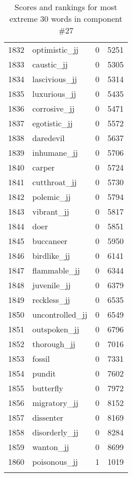 \begin{longtable}[!htbp]{| rlr@{.}l |}
    1832 & optimistic\_jj & 0 & 5251 \\
    1833 & caustic\_jj & 0 & 5305 \\
    1834 & lascivious\_jj & 0 & 5314 \\
    1835 & luxurious\_jj & 0 & 5435 \\
    1836 & corrosive\_jj & 0 & 5471 \\
    1837 & egotistic\_jj & 0 & 5572 \\
    1838 & daredevil & 0 & 5637 \\
    1839 & inhumane\_jj & 0 & 5706 \\
    1840 & carper & 0 & 5724 \\
    1841 & cutthroat\_jj & 0 & 5730 \\
    1842 & polemic\_jj & 0 & 5794 \\
    1843 & vibrant\_jj & 0 & 5817 \\
    1844 & doer & 0 & 5851 \\
    1845 & buccaneer & 0 & 5950 \\
    1846 & birdlike\_jj & 0 & 6141 \\
    1847 & flammable\_jj & 0 & 6344 \\
    1848 & juvenile\_jj & 0 & 6379 \\
    1849 & reckless\_jj & 0 & 6535 \\
    1850 & uncontrolled\_jj & 0 & 6549 \\
    1851 & outspoken\_jj & 0 & 6796 \\
    1852 & thorough\_jj & 0 & 7016 \\
    1853 & fossil & 0 & 7331 \\
    1854 & pundit & 0 & 7602 \\
    1855 & butterfly & 0 & 7972 \\
    1856 & migratory\_jj & 0 & 8152 \\
    1857 & dissenter & 0 & 8169 \\
    1858 & disorderly\_jj & 0 & 8284 \\
    1859 & wanton\_jj & 0 & 8699 \\
    1860 & poisonous\_jj & 1 & 1019 \\
    \hline
    \caption{Scores and rankings for most extreme 30 words in component \#27} \\
\end{longtable}
